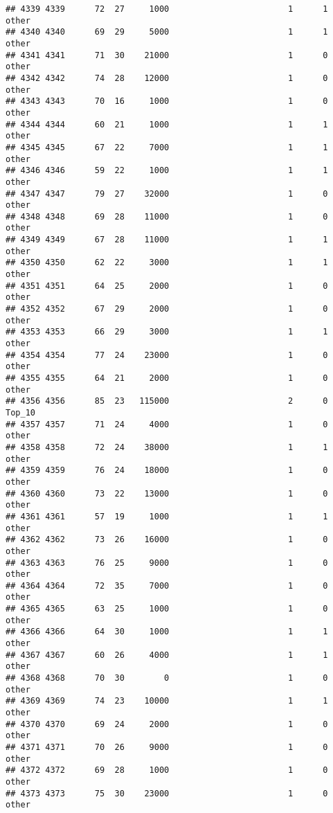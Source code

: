 \documentclass[
]{article}
\begin{document}
\begin{verbatim}
## 4339 4339      72  27     1000                        1      1    other
## 4340 4340      69  29     5000                        1      1    other
## 4341 4341      71  30    21000                        1      0    other
## 4342 4342      74  28    12000                        1      0    other
## 4343 4343      70  16     1000                        1      0    other
## 4344 4344      60  21     1000                        1      1    other
## 4345 4345      67  22     7000                        1      1    other
## 4346 4346      59  22     1000                        1      1    other
## 4347 4347      79  27    32000                        1      0    other
## 4348 4348      69  28    11000                        1      0    other
## 4349 4349      67  28    11000                        1      1    other
## 4350 4350      62  22     3000                        1      1    other
## 4351 4351      64  25     2000                        1      0    other
## 4352 4352      67  29     2000                        1      0    other
## 4353 4353      66  29     3000                        1      1    other
## 4354 4354      77  24    23000                        1      0    other
## 4355 4355      64  21     2000                        1      0    other
## 4356 4356      85  23   115000                        2      0   Top_10
## 4357 4357      71  24     4000                        1      0    other
## 4358 4358      72  24    38000                        1      1    other
## 4359 4359      76  24    18000                        1      0    other
## 4360 4360      73  22    13000                        1      0    other
## 4361 4361      57  19     1000                        1      1    other
## 4362 4362      73  26    16000                        1      0    other
## 4363 4363      76  25     9000                        1      0    other
## 4364 4364      72  35     7000                        1      0    other
## 4365 4365      63  25     1000                        1      0    other
## 4366 4366      64  30     1000                        1      1    other
## 4367 4367      60  26     4000                        1      1    other
## 4368 4368      70  30        0                        1      0    other
## 4369 4369      74  23    10000                        1      1    other
## 4370 4370      69  24     2000                        1      0    other
## 4371 4371      70  26     9000                        1      0    other
## 4372 4372      69  28     1000                        1      0    other
## 4373 4373      75  30    23000                        1      0    other

\end{verbatim}
\end{document}
